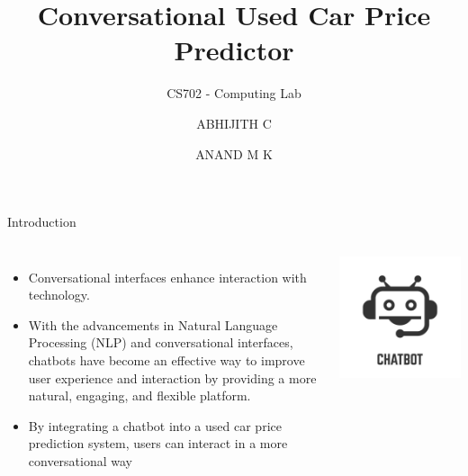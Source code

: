 \documentclass{beamer}
\title{Conversational Used Car Price Predictor}
\subtitle{CS702 - Computing Lab}
\author{ABHIJITH C \and ANAND M K}
\institute{Department of Computer Science and Engineering \\ NITK Surathkal}
\date{}  %
\begin{document}
\begin{frame}[t]
    \titlepage
\end{frame}

\begin{frame}[t]{Introduction}
    \begin{columns}
        \begin{itemize}
            \item Conversational interfaces enhance interaction with technology.
	\item With the advancements in Natural Language Processing (NLP) and conversational interfaces, chatbots have become an effective way to improve user experience and interaction by providing a more natural, engaging, and flexible platform.
            \item By integrating a chatbot into a used car price prediction system, users can interact in a more conversational way
        \end{itemize}
        
        \centering
        \includegraphics[width=\linewidth]{Chatbot.jpg}  %
    \end{columns}
\end{frame}
\end{document}
